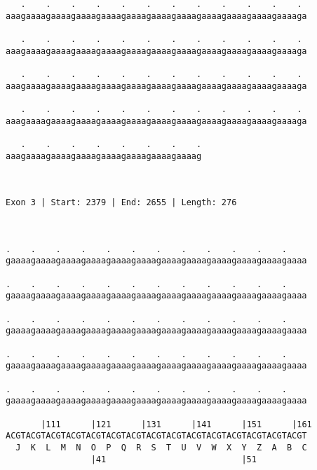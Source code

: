 \documentclass{article}
\begin{document}
\begin{Verbatim}
   .    .    .    .    .    .    .    .    .    .    .    . 
aaagaaaagaaaagaaaagaaaagaaaagaaaagaaaagaaaagaaaagaaaagaaaaga
                                                            
   .    .    .    .    .    .    .    .    .    .    .    . 
aaagaaaagaaaagaaaagaaaagaaaagaaaagaaaagaaaagaaaagaaaagaaaaga
                                                            
   .    .    .    .    .    .    .    .    .    .    .    . 
aaagaaaagaaaagaaaagaaaagaaaagaaaagaaaagaaaagaaaagaaaagaaaaga
                                                            
   .    .    .    .    .    .    .    .    .    .    .    . 
aaagaaaagaaaagaaaagaaaagaaaagaaaagaaaagaaaagaaaagaaaagaaaaga
                                                            
   .    .    .    .    .    .    .    .
aaagaaaagaaaagaaaagaaaagaaaagaaaagaaaag
                                       
                                       
 
Exon 3 | Start: 2379 | End: 2655 | Length: 276



.    .    .    .    .    .    .    .    .    .    .    .    
gaaaagaaaagaaaagaaaagaaaagaaaagaaaagaaaagaaaagaaaagaaaagaaaa
                                                            
.    .    .    .    .    .    .    .    .    .    .    .    
gaaaagaaaagaaaagaaaagaaaagaaaagaaaagaaaagaaaagaaaagaaaagaaaa
                                                            
.    .    .    .    .    .    .    .    .    .    .    .    
gaaaagaaaagaaaagaaaagaaaagaaaagaaaagaaaagaaaagaaaagaaaagaaaa
                                                            
.    .    .    .    .    .    .    .    .    .    .    .    
gaaaagaaaagaaaagaaaagaaaagaaaagaaaagaaaagaaaagaaaagaaaagaaaa
                                                            
.    .    .    .    .    .    .    .    .    .    .    .    
gaaaagaaaagaaaagaaaagaaaagaaaagaaaagaaaagaaaagaaaagaaaagaaaa
                                                            
       |111      |121      |131      |141      |151      |161
ACGTACGTACGTACGTACGTACGTACGTACGTACGTACGTACGTACGTACGTACGTACGT
  J  K  L  M  N  O  P  Q  R  S  T  U  V  W  X  Y  Z  A  B  C
                 |41                           |51          
  

\end{Verbatim}
\end{document}
